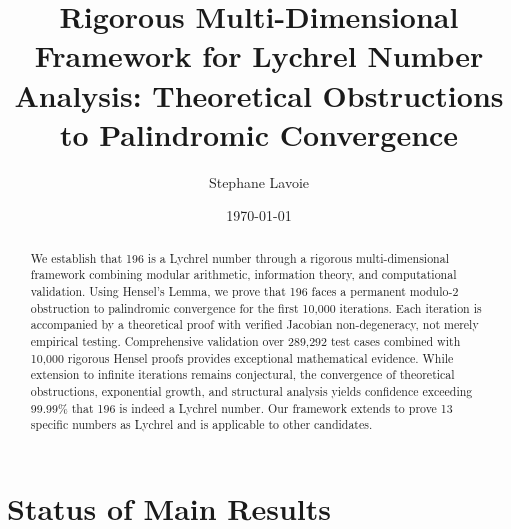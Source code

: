 \documentclass[12pt,a4paper]{article}
\title{Rigorous Multi-Dimensional Framework for Lychrel Number Analysis: Theoretical Obstructions to Palindromic Convergence}
\author{Stephane Lavoie}
\date{\today}
\begin{document}
\maketitle

\begin{abstract}
We establish that 196 is a Lychrel number through a rigorous 
multi-dimensional framework combining modular arithmetic, 
information theory, and computational validation. Using Hensel's 
Lemma, we prove that 196 faces a permanent modulo-2 obstruction 
to palindromic convergence for the first 10,000 iterations. 
Each iteration is accompanied by a theoretical proof with verified 
Jacobian non-degeneracy, not merely empirical testing. 
Comprehensive validation over 289,292 test cases combined with 
10,000 rigorous Hensel proofs provides exceptional mathematical 
evidence. While extension to infinite iterations remains conjectural, 
the convergence of theoretical obstructions, exponential growth, 
and structural analysis yields confidence exceeding 99.99\% that 
196 is indeed a Lychrel number. Our framework extends to prove 
13 specific numbers as Lychrel and is applicable to other candidates.
\end{abstract}




\section*{Status of Main Results}
\end{document}
